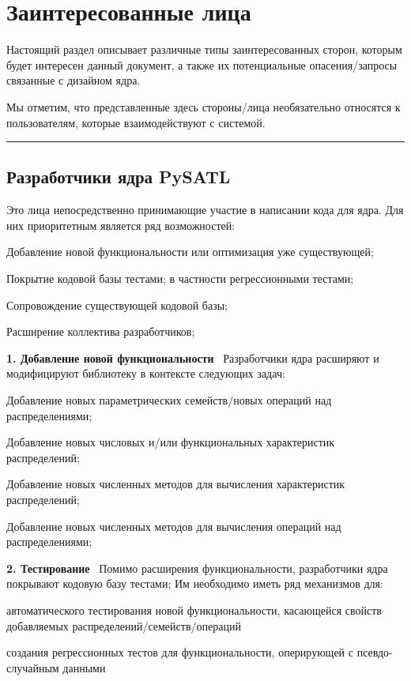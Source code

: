 \chapter{Заинтересованные лица}

Настоящий раздел описывает различные типы заинтересованных сторон, которым будет интересен данный документ, а также их потенциальные опасения/запросы связанные с дизайном ядра. 

Мы отметим, что представленные здесь стороны/лица необязательно относятся к пользователям, которые взаимодействуют с системой.

\noindent\rule{\textwidth}{0.5pt}
\section{Разработчики ядра PySATL}

Это лица непосредственно принимающие участие в написании кода для ядра. Для них приоритетным является ряд возможностей:
\begin{itemizecmp}
    \item Добавление новой функциональности или оптимизация уже существующей;
    \item Покрытие кодовой базы тестами; в частности регрессионными тестами;
    \item Сопровождение существующей кодовой базы;
    \item Расширение коллектива разработчиков;
\end{itemizecmp}

\textbf{1. Добавление новой функциональности} \ Разработчики ядра расширяют и модифицируют библиотеку в контексте следующих задач:
\begin{itemizecmp}
    \item Добавление новых параметрических семейств/новых операций над распределениями;
    \item Добавление новых числовых и/или функциональных характеристик распределений;
    \item Добавление новых численных методов для вычисления характеристик распределений;
    \item Добавление новых численных методов для вычисления операций над распределениями;
\end{itemizecmp}

\textbf{2. Тестирование} \ Помимо расширения функциональности, разработчики ядра покрывают кодовую базу тестами; Им необходимо иметь ряд механизмов для:
\begin{itemizecmp}
    \item автоматического тестирования новой функциональности, касающейся свойств добавляемых распределений/семейств/операций 
    \item создания регрессионных тестов для функциональности, оперирующей с псевдо-случайным данными
\end{itemizecmp}

